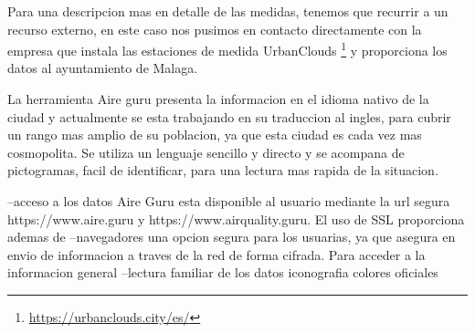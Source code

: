 Para una descripcion mas en detalle de las medidas, tenemos que recurrir a un recurso externo, en este caso nos pusimos en contacto directamente con
la empresa que instala las estaciones de medida UrbanClouds \footnote{\url{https://urbanclouds.city/es/}} y proporciona los datos al ayuntamiento de Malaga.

La herramienta Aire guru presenta la informacion en el idioma nativo de la ciudad y actualmente se esta trabajando en su traduccion 
al ingles, para cubrir un rango mas amplio de su poblacion, ya que esta ciudad es cada vez mas cosmopolita.
Se utiliza un lenguaje sencillo y directo y se acompana de pictogramas, facil de identificar, para una
lectura mas rapida de la situacion.



--acceso a los datos
Aire Guru esta disponible al usuario mediante la url segura https://www.aire.guru y https://www.airquality.guru.
El uso de SSL proporciona ademas de 
--navegadores
una opcion segura para los usuarias, ya que asegura en envio de informacion a traves de la red de forma
cifrada.
Para acceder a la informacion general
--lectura familiar de los datos
iconografia
colores oficiales
